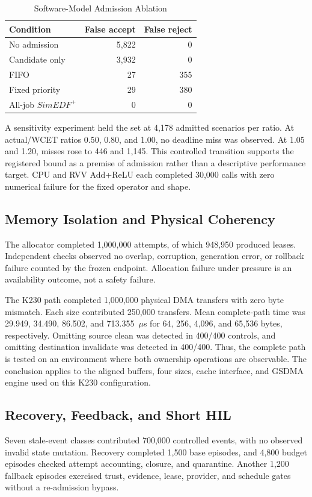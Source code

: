 \documentclass[lettersize,journal]{IEEEtran}
\begin{document}
\begin{table}[t]
\caption{Software-Model Admission Ablation}
\label{tab:ablation}
\centering
\footnotesize
\begin{tabular}{@{}lrr@{}}
\toprule
Condition & False accept & False reject \\
\midrule
No admission & 5,822 & 0 \\
Candidate only & 3,932 & 0 \\
FIFO & 27 & 355 \\
Fixed priority & 29 & 380 \\
All-job $SimEDF^+$ & 0 & 0 \\
\bottomrule
\end{tabular}
\end{table}

A sensitivity experiment held the set at 4,178 admitted scenarios per ratio.
At actual/WCET ratios 0.50, 0.80, and 1.00, no deadline miss was observed. At
1.05 and 1.20, misses rose to 446 and 1,145. This controlled transition supports
the registered bound as a premise of admission rather than a descriptive
performance target. CPU and RVV Add+ReLU each completed 30,000 calls with zero
numerical failure for the fixed operator and shape.

\subsection{Memory Isolation and Physical Coherency}
The allocator completed 1,000,000 attempts, of which 948,950 produced leases.
Independent checks observed no overlap, corruption, generation error, or
rollback failure counted by the frozen endpoint. Allocation failure under
pressure is an availability outcome, not a safety failure.

The K230 path completed 1,000,000 physical DMA transfers with zero byte
mismatch. Each size contributed 250,000 transfers. Mean complete-path time was
29.949, 34.490, 86.502, and 713.355~$\mu$s for 64, 256, 4,096, and 65,536 bytes,
respectively. Omitting source clean was detected in 400/400 controls, and
omitting destination invalidate was detected in 400/400. Thus, the complete
path is tested on an environment where both ownership operations are
observable. The conclusion applies to the aligned buffers, four sizes, cache
interface, and GSDMA engine used on this K230 configuration.

\subsection{Recovery, Feedback, and Short HIL}
Seven stale-event classes contributed 700,000 controlled events, with no
observed invalid state mutation. Recovery completed 1,500 base episodes, and
4,800 budget episodes checked attempt accounting, closure, and quarantine.
Another 1,200 fallback episodes exercised trust, evidence, lease, provider, and
schedule gates without a re-admission bypass.
\end{document}
